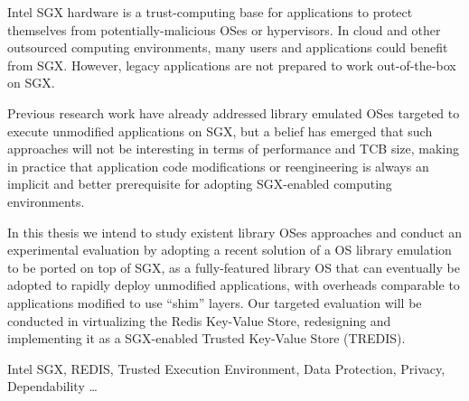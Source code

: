 
Intel SGX hardware is a trust-computing base for applications to protect themselves from potentially-malicious OSes or hypervisors. In cloud and other outsourced computing environments, many users and applications could benefit from SGX. 
However, legacy applications are not prepared to work out-of-the-box on SGX. 

Previous research work have already addressed library emulated OSes targeted to execute unmodified applications on SGX, but a belief has emerged that such approaches will not be interesting in terms of performance and TCB size, making in practice that application code modifications or reengineering is always an implicit and better prerequisite for adopting SGX-enabled computing environments. 

In this thesis we intend to study existent library OSes approaches and conduct an experimental evaluation by adopting a recent solution of a OS library emulation to be ported on top of SGX, as a fully-featured library OS that can eventually be adopted to rapidly deploy unmodified applications, with overheads comparable to applications modified to use “shim” layers. Our targeted evaluation will be conducted in virtualizing the Redis Key-Value Store, redesigning and implementing it as a SGX-enabled Trusted Key-Value Store (TREDIS).
\begin{keywords}
Intel SGX, REDIS, Trusted Execution Environment, Data Protection, Privacy, Dependability \ldots
\end{keywords} 


